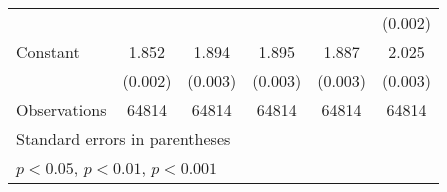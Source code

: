 {\begin{tabular}{l*{5}{c}}
                    &                     &                     &                     &                     &     (0.002)         \\
[1em]
Constant            &       1.852\sym{***}&       1.894\sym{***}&       1.895\sym{***}&       1.887\sym{***}&       2.025\sym{***}\\
                    &     (0.002)         &     (0.003)         &     (0.003)         &     (0.003)         &     (0.003)         \\
\hline
Observations        &       64814         &       64814         &       64814         &       64814         &       64814         \\
\hline\hline
\multicolumn{6}{l}{\footnotesize Standard errors in parentheses}\\
\multicolumn{6}{l}{\footnotesize \sym{*} \(p<0.05\), \sym{**} \(p<0.01\), \sym{***} \(p<0.001\)}\\
\end{tabular}
}
